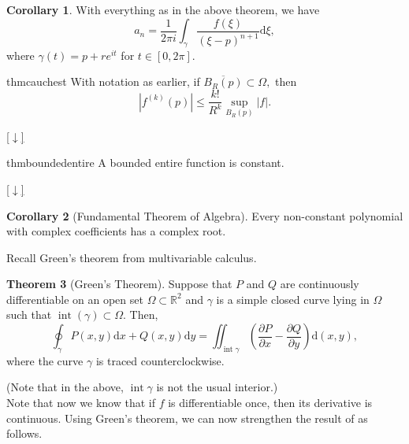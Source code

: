 \documentclass[12pt,oneside]{book}
\theoremstyle{definition}
\newtheorem{thm}{Theorem}
\numberwithin{thm}{chapter}
\newtheorem{cor}[thm]{Corollary}
\newcommand{\downsym}{[$\downarrow$]}
\begin{document}
\begin{cor}
	With everything as in the above theorem, we have
	\begin{equation} \label{eq:powsercoeff}
		a_n = \dfrac{1}{2\pi i}\int_{\gamma}^{} \dfrac{f(\xi)}{(\xi - p)^{n+1}} \mathrm{d}\xi,
	\end{equation}
	where $\gamma(t) = p + re^{it}$ for $t \in [0, 2\pi].$
\end{cor}

\begin{restatable}{thm}{cauchest}
\label{thm:cauchest}
	With notation as earlier, if $\overline{B_R(p)} \subset \Omega,$ then
	\begin{equation*} 
		|f^{(k)}(p)| \le \dfrac{k!}{R^k}\sup_{B_R(p)}|f|.
	\end{equation*}
\end{restatable}
\begin{flushright}\hyperref[thm:cauchest2]{\downsym}\end{flushright}

\begin{restatable}{thm}{boundedentire}
\label{thm:boundedentire}
	A bounded entire function is constant.
\end{restatable}
\begin{flushright}\hyperref[thm:boundedentire2]{\downsym}\end{flushright}

\begin{cor}[Fundamental Theorem of Algebra]
	Every non-constant polynomial with complex coefficients has a complex root.
\end{cor}

Recall Green's theorem from multivariable calculus.
\begin{thm}[Green's Theorem] \label{thm:greens}
	Suppose that $P$ and $Q$ are continuously differentiable on an open set $\Omega \subset \mathbb{R}^2$ and $\gamma$ is a simple closed curve lying in $\Omega$ such that $\operatorname{int}(\gamma) \subset \Omega.$ Then,
	\begin{equation*} 
		\oint_\gamma P(x, y)\mathrm{d}x + Q(x, y)\mathrm{d}y = \iint_{\operatorname{int} \gamma}\left(\dfrac{\partial P}{\partial x} - \dfrac{\partial Q}{\partial y}\right)\mathrm{d}(x, y),
	\end{equation*}
	where the curve $\gamma$ is traced counterclockwise.
\end{thm}
(Note that in the above, $\operatorname{int}\gamma$ is not the usual interior.)\\
Note that now we know that if $f$ is differentiable once, then its derivative is continuous. Using Green's theorem, we can now strengthen the result of  as follows.
\end{document}
